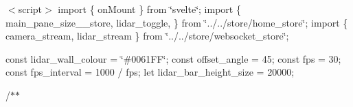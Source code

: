 $<$script$>$ import \{ on\+Mount \} from \char`\"{}svelte\char`\"{}; import \{ main\+\_\+pane\+\_\+size\+\_\+\_\+store, lidar\+\_\+toggle, \} from \char`\"{}../../store/home\+\_\+store\char`\"{}; import \{ camera\+\_\+stream, lidar\+\_\+stream \} from \char`\"{}../../store/websocket\+\_\+store\char`\"{};

const lidar\+\_\+wall\+\_\+colour = \char`\"{}\#0061\+FF\char`\"{}; const offset\+\_\+angle = 45; const fps = 30; const fps\+\_\+interval = 1000 / fps; let lidar\+\_\+bar\+\_\+height\+\_\+size = 20000;

/$\ast$$\ast$
\begin{DoxyItemize}
\item 
\end{DoxyItemize}